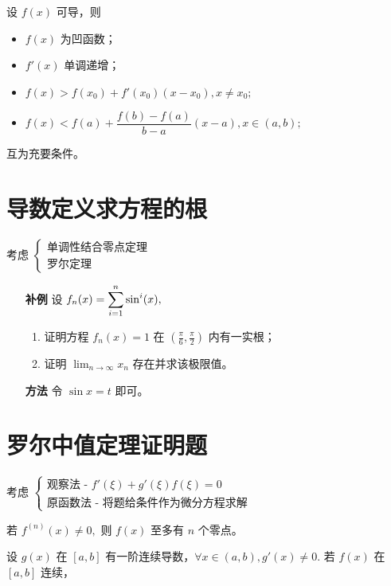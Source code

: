 设 $ f(x) $ 可导，则
\begin{itemize}
    \item $ f(x) $ 为凹函数；
    \item $ f'(x) $ 单调递增；
    \item $ f(x) > f(x_0) + f'(x_0)(x-x_0), x\neq x_0; $ 
    \item $ f(x) < f(a) + \dfrac{f(b) - f(a)}{b-a}(x-a),x\in(a,b); $ 
\end{itemize}

互为充要条件。

\section{导数定义求方程的根}

考虑 $ \begin{cases}
    \textrm{单调性结合零点定理}\\\textrm{罗尔定理}
\end{cases} $ 

\begin{enumerate}
    \item[\textbf{补例}] 设 $ f_n(x) = \displaystyle \sum_{i=1}^n \sin^i(x), $ 
    \begin{enumerate}[label = \Roman*.]
        \item 证明方程 $ f_n(x) = 1 $ 在 $ (\frac{\pi}{6},\frac\pi 2) $ 内有一实根；
        \item 证明 $ {\displaystyle\lim_{n\rightarrow \infty}}x_n $ 存在并求该极限值。
    \end{enumerate}
    \item[\textbf{方法}] 令 $ \sin x = t $ 即可。
\end{enumerate}

\section{罗尔中值定理证明题}

考虑 $ \begin{cases}
    \textrm{观察法 - } f'(\xi) + g'(\xi)f(\xi) = 0\\\textrm{原函数法 - 将题给条件作为微分方程求解}
\end{cases} $ 


若 $ f^{(n)}(x) \neq 0, $ 则 $ f(x) $ 至多有 $ n $ 个零点。


设 $ g(x) $ 在 $ [a,b] $ 有一阶连续导数，$ \forall x\in (a,b), g'(x)\neq 0. $ 
若 $ f(x) $ 在 $ [a,b] $ 连续，

